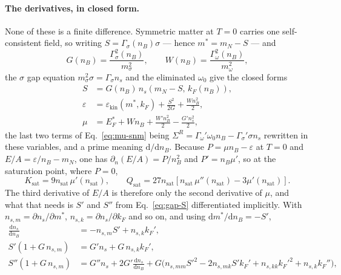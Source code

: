 \documentclass[aps,prc,onecolumn,superscriptaddress,nofootinbib,10pt]{revtex4-2}
\newcommand{\nB}{n_B}
\newcommand{\nsat}{n_{\mathrm{sat}}}
\begin{document}
\paragraph{The derivatives, in closed form.} None of these is a finite
difference. Symmetric matter at $T = 0$ carries one self-consistent field, so
writing $S = \Gamma_\sigma(\nB) \sigma$ --- hence $m^* = m_N - S$ --- and
%
\begin{equation}
G(\nB) = \frac{\Gamma_\sigma^2(\nB)}{m_\sigma^2},
\qquad
W(\nB) = \frac{\Gamma_\omega^2(\nB)}{m_\omega^2},
\end{equation}
%
the $\sigma$ gap equation $m_\sigma^2 \sigma = \Gamma_\sigma n_s$ and the
eliminated $\omega_0$ give the closed forms
%
\begin{align}
S &= G(\nB)\, n_s\!\left(m_N - S,\, k_F(\nB)\right),
\label{eq:gap-S} \\
\varepsilon &= \varepsilon_{\mathrm{kin}}(m^*, k_F)
  + \frac{S^2}{2G} + \frac{W \nB^2}{2}, \\
\mu &= E^*_F + W \nB + \frac{W' \nB^2}{2} - \frac{G' n_s^2}{2},
\label{eq:mu-snm}
\end{align}
%
the last two terms of Eq.~\eqref{eq:mu-snm} being
$\Sigma^R = \Gamma_\omega' \omega_0 \nB - \Gamma_\sigma' \sigma n_s$ rewritten
in these variables, and a prime meaning $\mathrm{d}/\mathrm{d}\nB$. Because
$P = \mu \nB - \varepsilon$ at $T = 0$ and $E/A = \varepsilon/\nB - m_N$, one
has $\partial_n(E/A) = P/\nB^2$ and $P' = \nB \mu'$, so at the saturation
point, where $P = 0$,
%
\begin{equation}
K_{\mathrm{sat}} = 9 \nsat\, \mu'(\nsat),
\qquad
Q_{\mathrm{sat}} = 27 \nsat \left[ \nsat\, \mu''(\nsat)
  - 3 \mu'(\nsat) \right].
\label{eq:KQ-from-mu}
\end{equation}
%
The third derivative of $E/A$ is therefore only the second derivative of
$\mu$, and what that needs is $S'$ and $S''$ from Eq.~\eqref{eq:gap-S}
differentiated implicitly. With $n_{s,m} = \partial n_s/\partial m^*$,
$n_{s,k} = \partial n_s/\partial k_F$ and so on, and using
$\mathrm{d}m^*/\mathrm{d}\nB = -S'$,
%
\begin{align}
\frac{\mathrm{d} n_s}{\mathrm{d}\nB}
  &= -n_{s,m} S' + n_{s,k} k_F' , \\
S' \left(1 + G\, n_{s,m}\right)
  &= G' n_s + G\, n_{s,k} k_F' , \\
S'' \left(1 + G\, n_{s,m}\right)
  &= G'' n_s + 2 G' \frac{\mathrm{d} n_s}{\mathrm{d}\nB}
   + G \Big( n_{s,mm} S'^2 - 2 n_{s,mk} S' k_F'
   + n_{s,kk} k_F'^2 + n_{s,k} k_F'' \Big) ,
\end{align}
\end{document}
